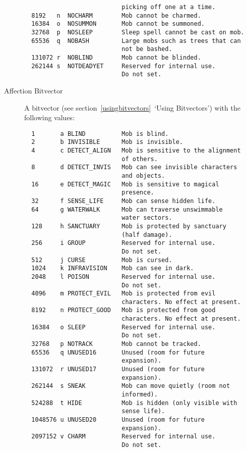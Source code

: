\documentclass[11pt]{article}
\begin{document}
\begin{description}
\begin{verbatim}
                           picking off one at a time.
  8192   n  NOCHARM        Mob cannot be charmed.
  16384  o  NOSUMMON       Mob cannot be summoned.
  32768  p  NOSLEEP        Sleep spell cannot be cast on mob.
  65536  q  NOBASH         Large mobs such as trees that can
                           not be bashed.
  131072 r  NOBLIND        Mob cannot be blinded.
  262144 s  NOTDEADYET     Reserved for internal use.
                           Do not set.
\end{verbatim}
\item[Affection Bitvector] A bitvector (see section~\vref{usingbitvectors}~`Using Bitvectors') with the following values:
\begin{verbatim}
  1       a BLIND          Mob is blind.
  2       b INVISIBLE      Mob is invisible.
  4       c DETECT_ALIGN   Mob is sensitive to the alignment
                           of others.
  8       d DETECT_INVIS   Mob can see invisible characters
                           and objects.
  16      e DETECT_MAGIC   Mob is sensitive to magical
                           presence.
  32      f SENSE_LIFE     Mob can sense hidden life.
  64      g WATERWALK      Mob can traverse unswimmable
                           water sectors.
  128     h SANCTUARY      Mob is protected by sanctuary
                           (half damage).
  256     i GROUP          Reserved for internal use.
                           Do not set.
  512     j CURSE          Mob is cursed.
  1024    k INFRAVISION    Mob can see in dark.
  2048    l POISON         Reserved for internal use.
                           Do not set.
  4096    m PROTECT_EVIL   Mob is protected from evil
                           characters. No effect at present.
  8192    n PROTECT_GOOD   Mob is protected from good
                           characters. No effect at present.
  16384   o SLEEP          Reserved for internal use.
                           Do not set.
  32768   p NOTRACK        Mob cannot be tracked.
  65536   q UNUSED16       Unused (room for future
                           expansion).
  131072  r UNUSED17       Unused (room for future
                           expansion).
  262144  s SNEAK          Mob can move quietly (room not
                           informed).
  524288  t HIDE           Mob is hidden (only visible with
                           sense life).
  1048576 u UNUSED20       Unused (room for future
                           expansion).
  2097152 v CHARM          Reserved for internal use.
                           Do not set.
\end{verbatim}

\end{description}
\end{document}
